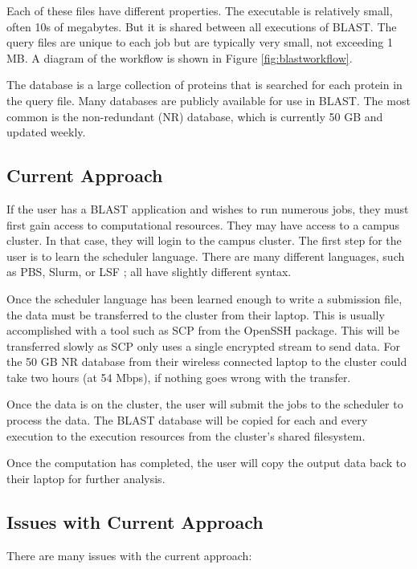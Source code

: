 Each of these files have different properties.  The executable is relatively small, often 10s of megabytes.  But it is shared between all executions of BLAST.  The query files are unique to each job but are typically very small, not exceeding 1 MB.  A diagram of the workflow is shown in Figure \ref{fig:blastworkflow}.

The database is a large collection of proteins that is searched for each protein in the query file.  Many databases are publicly available for use in BLAST.  The most common is the non-redundant (NR) database, which is currently 50 GB and updated weekly.

\subsection{Current Approach}

If the user has a BLAST application and wishes to run numerous jobs, they must first gain access to computational resources.  They may have access to a campus cluster.  In that case, they will login to the campus cluster.  The first step for the user is to learn the scheduler language.  There are many different languages, such as PBS, Slurm, or LSF \cite{computinglsf}; all  have slightly different syntax.

Once the scheduler language has been learned enough to write a submission file, the data must be transferred to the cluster from their laptop.  This is usually accomplished with a tool such as SCP from the OpenSSH \cite{openssh} package.  This will be transferred slowly as SCP only uses a single encrypted stream to send data.  For the 50 GB NR database from their wireless connected laptop to the cluster could take two hours (at 54 Mbps), if nothing goes wrong with the transfer.

Once the data is on the cluster, the user will submit the jobs to the scheduler to process the data.  The BLAST database will be copied for each and every execution to the execution resources from the cluster's shared filesystem.

Once the computation has completed, the user will copy the output data back to their laptop for further analysis.

\subsection{Issues with Current Approach}

There are many issues with the current approach:

